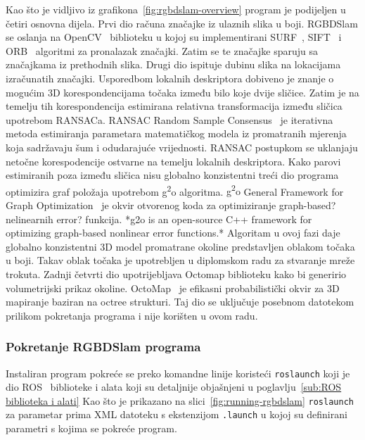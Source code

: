 Kao što je vidljivo iz grafikona~\ref{fig:rgbdslam-overview} program je
podijeljen u četiri osnovna dijela. Prvi dio računa značajke iz ulaznih
slika u boji. RGBDSlam se oslanja na OpenCV~\cite{opencv_library}
biblioteku u kojoj su implementirani SURF~\cite{Bay06surf:speeded},
SIFT~\cite{Lowe04distinctiveimage} i ORB~\cite{1302} algoritmi za
pronalazak značajki. Zatim se te značajke sparuju sa značajkama iz
prethodnih slika. Drugi dio ispituje dubinu slika na lokacijama
izračunatih značajki. Usporedbom lokalnih deskriptora dobiveno je znanje
o mogućim 3D korespondencijama točaka između bilo koje dvije sličice.
Zatim je na temelju tih korespondencija estimirana relativna
transformacija između sličica upotrebom RANSACa. RANSAC Random Sample
Consensus~\cite{AICPub836:1981} je iterativna metoda estimiranja
parametara matematičkog modela iz promatranih mjerenja koja sadržavaju
šum i odudarajuće vrijednosti. RANSAC postupkom se uklanjaju netočne
korespodencije ostvarne na temelju lokalnih deskriptora. Kako parovi
estimiranih poza između sličica nisu globalno konzistentni treći dio
programa optimizira graf položaja upotrebom g\textsuperscript{2}o
algoritma. {g\textsuperscript{2}o} General Framework for Graph
Optimization~\cite{kuemmerle11icra} je okvir otvorenog koda za
optimiziranje graph-based? nelinearnih error? funkcija. 
*g2o is an open-source C++ framework for optimizing graph-based nonlinear
error functions.*
Algoritam u ovoj
fazi daje globalno konzistentni 3D model promatrane okoline predstavljen
oblakom točaka u boji. Takav oblak točaka je upotrebljen u diplomskom
radu za stvaranje mreže trokuta. Zadnji četvrti dio upotrijebljava
Octomap biblioteku kako bi generirio volumetrijski prikaz okoline.
{OctoMap}~\cite{hornung13auro} je efikasni probabilistički okvir za 3D
mapiranje baziran na octree strukturi. Taj dio se uključuje posebnom
datotekom prilikom pokretanja programa i nije korišten u ovom radu.


\newpage
\subsubsection{Pokretanje RGBDSlam programa} %
\label{ssub:Pokretanje RGBDSlam programa}

Instaliran program pokreće se preko komandne linije koristeći
\texttt{roslaunch} koji je dio ROS~\cite{288} biblioteke i alata
koji su detaljnije objašnjeni u poglavlju~\ref{sub:ROS biblioteka i
alati} Kao što je prikazano na slici~\ref{fig:running-rgbdslam}
\texttt{roslaunch} za parametar prima XML datoteku s ekstenzijom
\texttt{.launch} u kojoj su definirani parametri s kojima se pokreće
program.

